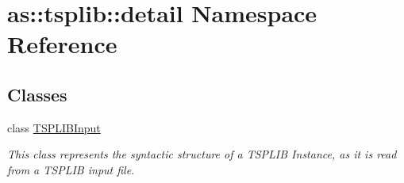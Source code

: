 \hypertarget{namespaceas_1_1tsplib_1_1detail}{}\section{as\+:\+:tsplib\+:\+:detail Namespace Reference}
\label{namespaceas_1_1tsplib_1_1detail}
\subsection*{Classes}
\begin{DoxyCompactItemize}
\item 
class \hyperlink{classas_1_1tsplib_1_1detail_1_1TSPLIBInput}{T\+S\+P\+L\+I\+B\+Input}
\begin{DoxyCompactList}\small\item\em This class represents the syntactic structure of a T\+S\+P\+L\+IB Instance, as it is read from a T\+S\+P\+L\+IB input file. \end{DoxyCompactList}\end{DoxyCompactItemize}
